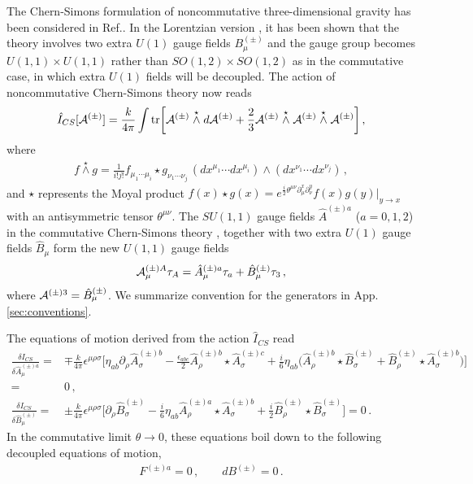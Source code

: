 \documentclass[11pt]{article}
\newcommand{\tr}{\mbox{tr}}
\newcommand{\bR}{{\bm{R}}}
\newcommand{\nn}{\nonumber}
\numberwithin{equation}{section}
\newcommand{\swedge}{\stackrel{\star}{\wedge}}
\begin{document}
The Chern-Simons formulation of noncommutative three-dimensional
gravity has been considered in Ref.\cite{Banados:2001xw,Cacciatori:2002gq}.
In the Lorentzian version \cite{Cacciatori:2002gq}, it has been shown that
the theory involves two extra $U(1)$ gauge
fields $B^{(\pm)}_\mu$ and the gauge group becomes $U(1,1)\times U(1,1)$ rather than
$SO(1,2)\times SO(1,2)$ as in the commutative case, in which extra $U(1)$ fields will be decoupled.  The action of noncommutative Chern-Simons theory now reads
\begin{align}
  \hat{I}_{CS}[{\cal A}^{(\pm)}]=
\frac{k}{4\pi} \int \tr \bigg[
{\cal A}^{(\pm)} \swedge d  {\cal A}^{(\pm)}
+ \frac{2}{3} {\cal A}^{(\pm)} \swedge {\cal A}^{(\pm)} \swedge {\cal A}^{(\pm)}
\bigg] \,,
\end{align}
where
\begin{align}
  f \swedge g = \frac{1}{i!j!} f_{\mu_1 \cdots \mu_i} \star g_{\nu_1 \cdots \nu_j}
\, (dx^{\mu_1} \cdots dx^{\mu_i}) \wedge  (dx^{\nu_1} \cdots
  dx^{\nu_j}) \,,
\end{align}
and $\star$ represents the Moyal product
$f(x) \star g(x) =
e^{\frac{i}{2}\theta^{\mu\nu} \partial_\mu^x \partial_\nu^y} f(x) g(y)
\bigg|_{y \rightarrow x}$
 with an antisymmetric tensor $\theta^{\mu\nu}$.
The $SU(1,1)$ gauge fields $\hat{A}^{(\pm) a}$ ($a=0,1,2$) in 
the commutative Chern-Simons theory
, together with two extra $U(1)$ gauge fields
$\hat{B}_\mu$
form the new $U(1,1)$ gauge fields
\begin{align}
  {\cal A}_\mu^{(\pm)A} \tau_A = \hat{A}^{(\pm)a}_\mu \tau_a +  \hat{B}^{(\pm)}_\mu \tau_3 \,,
\end{align}
where ${\cal A}^{(\pm)3}=\hat{B}^{(\pm)}_\mu$.  We summarize convention for the
generators in App.\ref{sec:conventions}.


The equations of motion derived from the action $\hat{I}_{CS}$ read
\begin{align}
  \frac{\delta I_{CS}}{\delta \hat{A}_\mu^{(\pm)a}}=&
\mp \frac{k}{4\pi} \epsilon^{\mu\rho\sigma}
\bigg[
\eta_{ab}\partial_\rho \hat{A}_\sigma^{(\pm)b}
-\frac{\epsilon_{abc}}{2}\hat{A}_\rho^{(\pm)b}  \star \hat{A}_\sigma^{(\pm)c}
+\frac{i}{6}\eta_{ab}\big( \hat{A}_\rho^{(\pm)b} \star \hat{B}_\sigma^{(\pm)} +
                                               \hat{B}_\rho^{(\pm)} \star \hat{A}_\sigma^{(\pm)b} \big)
 \bigg]
\nn\\=& 0 \,,\\
  \frac{\delta I_{CS}}{\delta \hat{B}_\mu^{(\pm)}}=&
\pm \frac{k}{4\pi} \epsilon^{\mu\rho\sigma} 
\bigg[
\partial_\rho \hat{B}_\sigma^{(\pm)}
-\frac{i}{6} \eta_{ab} \hat{A}_\rho^{(\pm)a} \star \hat{A}_\sigma^{(\pm)b}
+ \frac{i}{2}\hat{B}_\rho^{(\pm)} \star \hat{B}_\sigma^{(\pm)}
\bigg]=0 \,.
\end{align}
In the commutative limit $\theta\rightarrow 0$, 
these equations boil down to the following decoupled equations of
motion,
\begin{align}
  F^{(\pm)a}=0 \,, \qquad
dB^{(\pm)}=0 \,.
\end{align}
\end{document}
